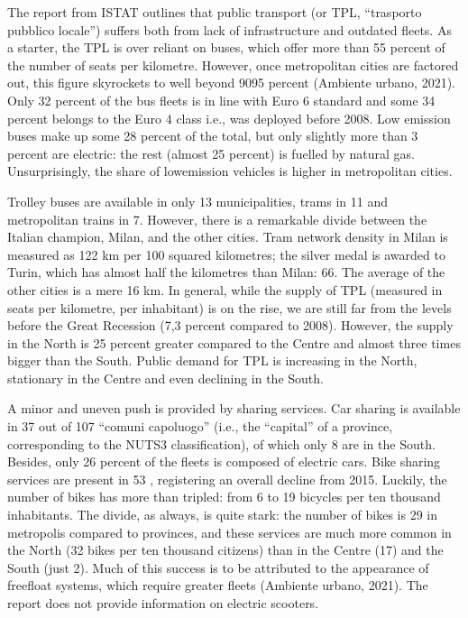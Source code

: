 \documentclass[letterpaper,10pt,english]{jupyterBook}
\begin{document}
\sphinxAtStartPar
The report from ISTAT outlines that public transport (or TPL, “trasporto pubblico locale”) suffers both from lack of infrastructure and outdated fleets. As a starter, the TPL is over reliant on buses, which offer more than 55 percent of the number of seats per kilometre. However, once metropolitan cities are factored out, this figure skyrockets to well beyond 90\sphinxhyphen{}95 percent (Ambiente urbano, 2021). Only 32 percent of the bus fleets is in line with Euro 6 standard and some 34 percent belongs to the Euro 4 class \sphinxhyphen{} i.e., was deployed before 2008. Low emission buses make up some 28 percent of the total, but only slightly more than 3 percent are electric: the rest (almost 25 percent) is fuelled by natural gas. Unsurprisingly, the share of low\sphinxhyphen{}emission vehicles is higher in metropolitan cities.

\sphinxAtStartPar
Trolley buses are available in only 13 municipalities, trams in 11 and metropolitan trains in 7. However, there is a remarkable divide between the Italian champion, Milan, and the other cities. Tram network density in Milan is measured as 122 km per 100 squared kilometres; the silver medal is awarded to Turin, which has almost half the kilometres than Milan: 66. The average of the other cities is a mere 16 km. In general, while the supply of TPL (measured in seats per kilometre, per inhabitant) is on the rise, we are still far from the levels before the Great Recession (\sphinxhyphen{}7,3 percent compared to 2008). However, the supply in the North is 25 percent greater compared to the Centre and almost three times bigger than the South. Public demand for TPL is increasing in the North, stationary in the Centre and even declining in the South.

\sphinxAtStartPar
A minor and uneven push is provided by sharing services. Car sharing is available in 37 out of 107 “comuni capoluogo” (i.e., the “capital” of a province, corresponding to the NUTS3 classification), of which only 8 are in the South. Besides, only 26 percent of the fleets is composed of electric cars. Bike sharing services are present in 53 , registering an overall decline from 2015. Luckily, the number of bikes has more than tripled: from 6 to 19 bicycles per ten thousand inhabitants. The divide, as always, is quite stark: the number of bikes is 29 in metropolis compared to provinces, and these services are much more common in the North (32 bikes per ten thousand citizens) than in the Centre (17) and the South (just 2). Much of this success is to be attributed to the appearance of free\sphinxhyphen{}float systems, which require greater fleets (Ambiente urbano, 2021). The report does not provide information on electric scooters.
\end{document}
